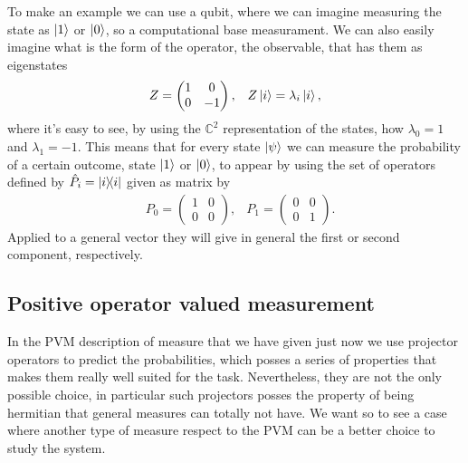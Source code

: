 {
    To make an example we can use a qubit, where we can imagine measuring the state as $\ket{1}$ or $\ket{0}$, so a computational base measurament. We can also easily imagine what is the form of the operator, the observable, that has them as eigenstates
    \begin{align}
        &Z = \begin{pmatrix}
            1 & 0\\
            0 & -1
        \end{pmatrix}, &Z\ket{i} = \lambda_i\ket{i},
    \end{align}
    where it's easy to see, by using the $\mathbb{C}^2$ representation of the states, how $\lambda_0 = 1$ and $\lambda_1 = -1$. This means that for every state $\ket{\psi}$ we can measure the probability of a certain outcome, state $\ket{1}$ or $\ket{0}$, to appear by using the set of operators defined by $\hat{P}_i = \ketbra{i}$ given as matrix by
    \begin{align}
        &P_0 = \begin{pmatrix}
            1 & 0\\
            0 & 0
        \end{pmatrix},
        &P_1 = \begin{pmatrix}
            0 & 0\\
            0 & 1
        \end{pmatrix}.
    \end{align}
    Applied to a general vector they will give in general the first or second component, respectively.
}

\subsection{Positive operator valued measurement}

In the PVM description of measure that we have given just now we use projector operators to predict the probabilities, which posses a series of properties that makes them really well suited for the task. Nevertheless, they are not the only possible choice, in particular such projectors posses the property of being hermitian that general measures can totally not have. We want so to see a case where another type of measure respect to the PVM can be a better choice to study the system.

